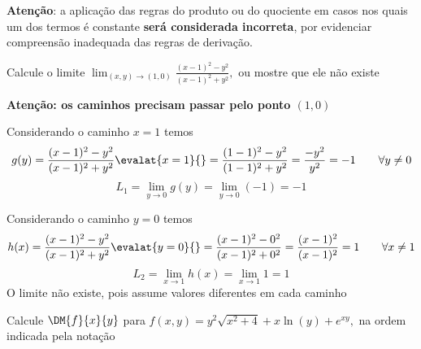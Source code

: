 \documentclass[a4paper,12pt,fleqn]{article}
\begin{document}

\bigskip
\textbf{Atenção}: a aplicação das regras do produto ou do quociente em casos
nos quais um dos termos é constante \textbf{será considerada incorreta},
por evidenciar compreensão inadequada das regras de derivação.

Calcule o limite
\(
  \lim_{(x,y)\to(1,0)} \frac{(x-1)^2 - y^2}{(x-1)^2 + y^2},
\)
ou mostre que ele não existe

\begin{answer}
  \textbf{Atenção: os caminhos precisam passar pelo ponto $(1, 0)$}
  \bigskip

  Considerando o caminho $x=1$ temos
  \[
    g(y)
    = \frac{(x-1)^2 - y^2}{(x-1)^2 + y^2} \evalat{x=1}{}
    = \frac{(1-1)^2 - y^2}{(1-1)^2 + y^2}
    = \frac{-y^2}{y^2}
    = -1 \qquad \forall y\neq 0
  \]
  \[
    L_1
    = \lim_{y\to 0} g(y)
    = \lim_{y\to 0} (-1)
    = -1
  \]

  Considerando o caminho $y=0$ temos
  \[
    h(x)
    = \frac{(x-1)^2 - y^2}{(x-1)^2 + y^2} \evalat{y=0}{}
    = \frac{(x-1)^2 - 0^2}{(x-1)^2 + 0^2}
    = \frac{(x-1)^2}{(x-1)^2}
    = 1 \qquad \forall x\neq 1
  \]
  \[
    L_2
    = \lim_{x\to 1} h(x)
    = \lim_{x\to 1} 1
    = 1
  \]
  O limite não existe, pois assume valores diferentes em cada caminho
\end{answer}

Calcule $\DM{f}{x}{y}$ para
\(
  f(x, y) = y^2\sqrt{x^2+4} + x\ln(y) + e^{xy},
\)
na ordem indicada pela notação
\end{document}
